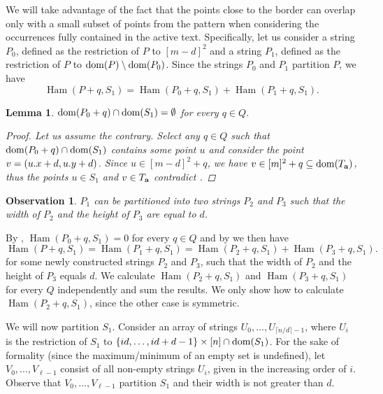 \documentclass[11pt]{article}
\newcommand{\set}[1]{\left\lbrace #1 \right\rbrace}
\theoremstyle{plain}
\newtheorem{lemma}{Lemma}
\newtheorem{observation}{Observation}
\theoremstyle{definition}
\theoremstyle{remark}
\DeclareMathOperator*{\Ham}{Ham}
\begin{document}
We will take advantage of the fact that the points close to the border can overlap only with a small subset of points from the pattern when considering the occurrences fully contained in the active text.
Specifically, let us consider a string $P_0$, defined as the restriction of $P$ to $[m - d]^2$ and a string $P_1$, defined as the restriction of $P$ to $\operatorname*{dom}(P) \setminus \operatorname*{dom}(P_0)$.
Since the strings $P_0$ and $P_1$ partition $P$, we have
$$ \Ham(P + q, S_1) = \Ham(P_0 + q, S_1) + \Ham(P_1 + q, S_1).$$

\begin{lemma}\label{border_hamming_reduction}
	$\operatorname*{dom}(P_0 + q) \cap \operatorname*{dom}(S_1) = \emptyset$ for every $q \in Q$.
	\begin{proof}
		Let us assume the contrary.
		Select any $q \in Q$ such that $\operatorname*{dom}(P_0 + q) \cap \operatorname*{dom}(S_1)$ 
		contains some point $u$ and consider the point $v = (u.x + d, u.y + d)$.
		Since $u \in [m - d]^2 + q$, we have $v \in [m]^2 + q \subseteq \operatorname*{dom}(T_\mathbf{a})$, thus the points $u \in S_1$ and $v \in T_\mathbf{a}$ contradict .
	\end{proof}
\end{lemma}

\begin{observation}\label{border_hamming_split}
	$P_1$ can be partitioned into two strings $P_2$ and $P_3$ such that the width of $P_2$ and the height of $P_3$ are equal to $d$.
\end{observation}

By , $\Ham(P_0 + q, S_1) = 0$ for every $q \in Q$
and by  we then have 
$$\Ham(P + q, S_1) = \Ham(P_1 + q, S_1) = \Ham(P_2 + q, S_1) + \Ham(P_3 + q, S_1). $$
for some newly constructed strings $P_2$ and $P_3$, such that the width of $P_2$ and the height of $P_3$ equals $d$.
We calculate $\Ham(P_2 + q, S_1)$ and $\Ham(P_3 + q, S_1)$ for every $Q$ independently and sum the results.
We only show how to calculate $\Ham(P_2 + q, S_1)$, since the other case is symmetric.

We will now partition $S_1$.
Consider an array of strings $U_0, \dots, U_{\lceil n / d \rceil - 1}$, where $U_i$ is the restriction of $S_1$ to $\set{id, \dots, id + d - 1} \times [n] \cap \d{S_1}$.
For the sake of formality (since the maximum/minimum of an empty set is undefined), let $V_0, \dots, V_{\ell - 1}$ consist of all non-empty strings $U_i$, given in the increasing order of $i$.
Observe that $V_0, \dots, V_{\ell - 1}$ partition $S_1$ and their width is not greater than $d$.
\end{document}
